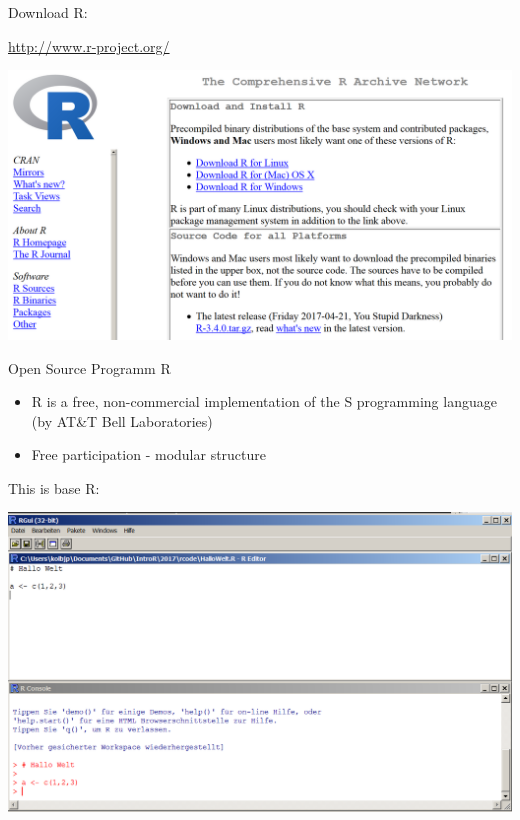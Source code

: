 \documentclass[
  10pt,
  ignorenonframetext,
]{beamer}
\providecommand{\tightlist}{%
  \setlength{\itemsep}{0pt}\setlength{\parskip}{0pt}}
\begin{document}
\begin{frame}{Download R:}
\protect\hypertarget{download-r}{}

\url{http://www.r-project.org/}

\includegraphics{figure/CRAN1picture.PNG}

\end{frame}

\begin{frame}{Open Source Programm R}
\protect\hypertarget{open-source-programm-r}{}

\begin{itemize}
\tightlist
\item
  R is a free, non-commercial implementation of the S programming
  language (by AT\&T Bell Laboratories)
\item
  Free participation - modular structure
\end{itemize}

\begin{block}{This is base R:}

\includegraphics{figure/BasisR.PNG}

\end{block}

\end{frame}
\end{document}
